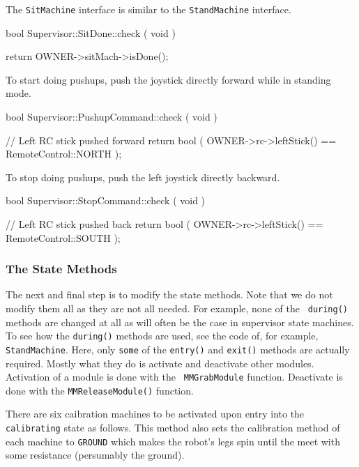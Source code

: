 \noindent The {\tt SitMachine} interface is similar to the {\tt StandMachine} interface.

\begin{codesegment}
bool Supervisor::SitDone::check ( void ) {

  return OWNER->sitMach->isDone();

}
\end{codesegment}

\noindent To start doing pushups, push the joystick directly forward while in standing mode.

\begin{codesegment}
bool Supervisor::PushupCommand::check ( void ) {

  // Left RC stick pushed forward
  return bool ( OWNER->rc->leftStick() == RemoteControl::NORTH );

}
\end{codesegment}

\noindent To stop doing pushups, push the left joystick directly backward.

\begin{codesegment}
bool Supervisor::StopCommand::check ( void ) {

  // Left RC stick pushed back
  return bool ( OWNER->rc->leftStick() == RemoteControl::SOUTH );

}
\end{codesegment}

\subsubsection{The State Methods}

The next and final step is to modify the state methods. Note that we do not
modify them all as they are not all needed. For example, none of the {\tt
during()} methods are changed at all as will often be the case in supervisor
state machines. To see how the {\tt during()} methods are used, see the code of,
for example, {\tt StandMachine}. Here, only {\tt some} of the {\tt entry()} and
{\tt exit()} methods are actually required. Mostly what they do is activate and
deactivate other modules. Activation of a module is done with the {\tt
MMGrabModule} function. Deactivate is done with the {\tt MMReleaseModule()}
function.

There are six caibration machines to be activated upon entry into the {\tt
calibrating} state as follows. This method also sets the calibration method of
each machine to {\tt GROUND} which makes the robot's legs spin until the meet
with some resistance (persumably the ground).

